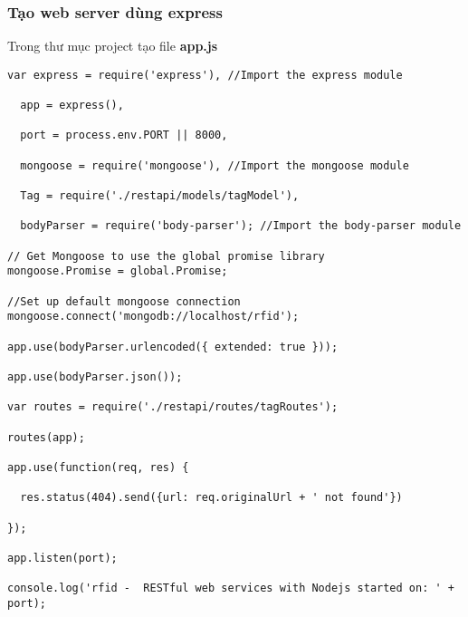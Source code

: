 \subsubsection{Tạo web server dùng express}
Trong thư mục project tạo file \textbf{app.js} 
\begin{lstlisting}
var express = require('express'), //Import the express module

  app = express(),

  port = process.env.PORT || 8000,

  mongoose = require('mongoose'), //Import the mongoose module

  Tag = require('./restapi/models/tagModel'),

  bodyParser = require('body-parser'); //Import the body-parser module
  
// Get Mongoose to use the global promise library
mongoose.Promise = global.Promise;

//Set up default mongoose connection
mongoose.connect('mongodb://localhost/rfid');

app.use(bodyParser.urlencoded({ extended: true }));

app.use(bodyParser.json());

var routes = require('./restapi/routes/tagRoutes');

routes(app);

app.use(function(req, res) {

  res.status(404).send({url: req.originalUrl + ' not found'})

});

app.listen(port);

console.log('rfid -  RESTful web services with Nodejs started on: ' + port);
\end{lstlisting}




